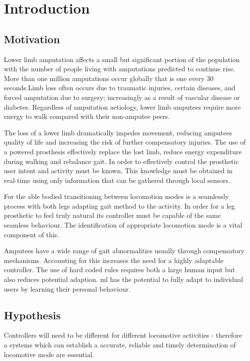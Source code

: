 \chapter{Introduction}
\label{chp:intro}

\section{Motivation}
Lower limb amputation affects a small but significant portion of the population with the number of people living with amputations predicted to continue rise. More than one million amputations occur globally that is one every 30 seconds.\cite{Asif2021}Limb loss often occurs due to traumatic injuries, certain diseases, and forced amputation due to surgery; increasingly as a result of vascular disease or diabetes\cite{Griffin2012}. Regardless of amputation aetiology, lower limb amputees require more energy to walk compared with their non-amputee peers\cite{Vllasolli2014}.

The loss of a lower limb dramatically impedes movement\cite{Gregg2014, Wong2021, Srisuwan2021}, reducing amputees quality of life and increasing the risk of further compensatory injuries. The use of a powered prosthesis effectively replace the lost limb, reduce energy expenditure during walking and rebalance gait\cite{Lin2014}. In order to effectively control the prosthetic user intent and activity must be known. This knowledge must be obtained in real-time using only information that can be gathered through local sensors.

For the able bodied transitioning between locomotion modes is a seamlessly process with both legs adapting gait method to the activity. In order for a leg prosthetic to feel truly natural its controller must be capable of the same seamless behaviour. The identification of appropriate locomotion mode is a vital component of this. 

Amputees have a wide range of gait abnormalities usually through compensatory mechanisms\cite{Tucker2015}. Accounting for this increases the need for a highly adaptable controller. The use of hard coded rules requires both a large human input but also reduces potential adaption. \acrfull{ml} has the potential to fully adapt to individual users by learning their personal behaviour.


\section{Hypothesis}
Controllers will need to be different for different locomotive activities - therefore a systems which can establish a accurate, reliable and timely determination of locomotive mode are essential.

